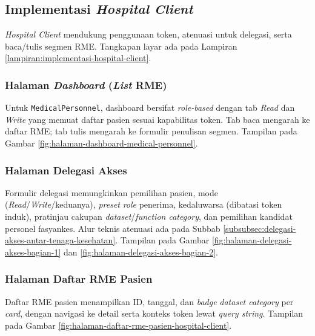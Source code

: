 \documentclass[bahasa, 12pt, a4paper, onecolumn, oneside, final]{report}
\begin{document}
\subsection{Implementasi \textit{Hospital Client}}
\label{subsec:implementasi-hospital-client}

\textit{Hospital Client} mendukung penggunaan token, atenuasi untuk delegasi, serta baca/tulis segmen RME. Tangkapan layar ada pada Lampiran \ref{lampiran:implementasi-hospital-client}.

\subsubsection{Halaman \textit{Dashboard} (\textit{List} RME)}
\label{subsubsec:halaman-dashboard-hospital-client}

Untuk \texttt{MedicalPersonnel}, dashboard bersifat \textit{role-based} dengan tab \textit{Read} dan \textit{Write} yang memuat daftar pasien sesuai kapabilitas token. Tab baca mengarah ke daftar RME; tab tulis mengarah ke formulir penulisan segmen. Tampilan pada Gambar \ref{fig:halaman-dashboard-medical-personnel}.

\subsubsection{Halaman Delegasi Akses}
\label{subsubsec:halaman-delegasi-akses-hospital-client}

Formulir delegasi memungkinkan pemilihan pasien, mode (\textit{Read}/\textit{Write}/keduanya), \textit{preset} \textit{role} penerima, kedaluwarsa (dibatasi token induk), pratinjau cakupan \textit{dataset}/\textit{function category}, dan pemilihan kandidat personel fasyankes. Alur teknis atenuasi ada pada Subbab \ref{subsubsec:delegasi-akses-antar-tenaga-kesehatan}. Tampilan pada Gambar \ref{fig:halaman-delegasi-akses-bagian-1} dan \ref{fig:halaman-delegasi-akses-bagian-2}.

\subsubsection{Halaman Daftar RME Pasien}
\label{subsubsec:halaman-daftar-emr-pasien-hospital-client}

Daftar RME pasien menampilkan ID, tanggal, dan \textit{badge} \textit{dataset category} per \textit{card}, dengan navigasi ke detail serta konteks token lewat \textit{query string}. Tampilan pada Gambar \ref{fig:halaman-daftar-rme-pasien-hospital-client}.
\end{document}
